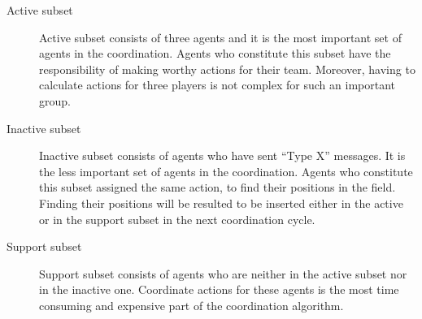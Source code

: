 \begin{description}
\item[Active subset] Active subset consists of three agents and it is the most important set of agents in the coordination. Agents who constitute this subset have the responsibility of making worthy actions for their team. Moreover, having to calculate actions for three players is not complex for such an important group. 

\item[Inactive subset] Inactive subset consists of agents who have sent ``Type X'' messages. It is the less important set of agents in the coordination. Agents who constitute this subset assigned the same action, to find their positions in the field. Finding their positions will be resulted to be inserted either in the active or in the support subset in the next coordination cycle.


\item[Support subset] Support subset consists of agents who are neither in the active subset nor in the inactive one. Coordinate actions for these agents is the most time consuming and expensive part of the coordination algorithm.
\end{description}

